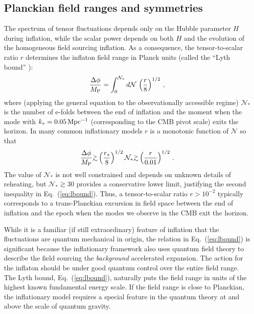 \subsection{Planckian field ranges and symmetries}
The spectrum of tensor fluctuations depends only on the Hubble parameter $H$ during inflation, while the scalar power depends on both $H$ and the evolution of the homogeneous field sourcing inflation. As a consequence, the tensor-to-scalar ratio $r$ determines the inflaton field range in Planck units (called the ``Lyth bound'' \cite{Lyth:1996im}):
\begin{equation}
\label{eq:Lyth}
\frac{\Delta\phi}{M_{\rm P}}=\int_0^{\mathcal{N}_\ast}d\mathcal{N}\,\left(\frac{r}{8}\right)^{1/2}\,,
\end{equation}
where (applying the general equation to the observationally accessible regime) $\mathcal{N}_\ast$ is the number of e-folds between the end of inflation and the moment when the mode with $k_\ast=0.05\,{\rm Mpc^{-1}}$ (corresponding to the CMB pivot scale) exits the horizon. In many common inflationary models $r$ is a monotonic function of $\mathcal{N}$ so that
\begin{equation}
\label{eq:lbound}
\frac{\Delta\phi}{M_{\rm P}}\gtrsim \left(\frac{r_\ast}{8}\right)^{1/2}\mathcal{N}_\ast\gtrsim \left(\frac{r}{0.01}\right)^{1/2}\,.
\end{equation}  
The value of $\mathcal{N}_\ast$ is not well constrained and depends on unknown details of reheating, but $\mathcal{N}_\ast\gtrsim 30$ provides a conservative lower limit, justifying the second inequality in Eq.~(\ref{eq:lbound}). Thus, a tensor-to-scalar ratio $r>10^{-2}$ typically corresponds to a trans-Planckian excursion in field space between the end of inflation and the epoch when the modes we observe in the CMB exit the horizon.

While it is a familiar (if still extraordinary) feature of inflation that the fluctuations are quantum mechanical in origin, the relation in Eq.~(\ref{eq:lbound}) is significant because the inflationary framework also uses quantum field theory to describe the field sourcing the {\it background\/} accelerated expansion. The action for the inflaton should be under good quantum control over the entire field range. The Lyth bound, Eq.~(\ref{eq:lbound}), naturally puts the field range in units of the highest known fundamental energy scale. If the field range is close to Planckian, the inflationary model requires a special feature in the quantum theory at and above the scale of quantum gravity.

